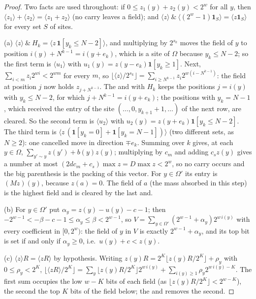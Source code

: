 \documentclass[11pt,a4paper]{article}
\theoremstyle{definition}
\theoremstyle{remark}
\begin{document}
\begin{proof}
Two facts are used throughout: if $0\le z_1(y)+z_2(y)<2^w$ for all $y$, then $\langle z_1\rangle+\langle z_2\rangle=\langle z_1+z_2\rangle$ (no carry leaves a field); and $\langle z\rangle\ \&\ \langle(2^w-1)\mathbf 1_S\rangle=\langle z\mathbf 1_S\rangle$ for every set $S$ of sites.

(a) $\langle z\rangle\ \&\ H_k=\langle z\,\mathbf 1[y_k\le N-2]\rangle$, and multiplying by $2^{s_k}$ moves the field of $y$ to position $i(y)+N^{k-1}=i(y+e_k)$, which is a site of $\Omega$ because $y_k\le N-2$; so the first term is $\langle u_1\rangle$ with $u_1(y)=z(y-e_k)\mathbf 1[y_k\ge1]$. Next, $\sum_{i<m}z_i2^{wi}<2^{wm}$ for every $m$, so $\lfloor\langle z\rangle/2^{s_k}\rfloor=\sum_{i\ge N^{k-1}}z_i2^{w(i-N^{k-1})}$: the field at position $j$ now holds $z_{j+N^{k-1}}$. The and with $H_k$ keeps the positions $j=i(y)$ with $y_k\le N-2$, for which $j+N^{k-1}=i(y+e_k)$; the positions with $y_k=N-1$, which received the entry of the site $(\dots,0,y_{k+1}+1,\dots)$ of the next row, are cleared. So the second term is $\langle u_2\rangle$ with $u_2(y)=z(y+e_k)\mathbf 1[y_k\le N-2]$. The third term is $\langle z\,(\mathbf 1[y_k=0]+\mathbf 1[y_k=N-1])\rangle$ (two different sets, as $N\ge2$): one cancelled move in direction $\mp e_k$. Summing over $k$ gives, at each $y\in\Omega$, $\sum_{y'\sim y}z(y')+b(y)z(y)$; multiplying by $c_m$ and adding $c_sz(y)$ gives a number at most $(2dc_m+c_s)\max z=D\max z<2^w$, so no carry occurs and the big parenthesis is the packing of this vector. For $y\in\Omega'$ its entry is $(Mz)(y)$, because $z(a)=0$. The field of $a$ (the mass absorbed in this step) is the highest field and is cleared by the last and.

(b) For $y\in\Omega'$ put $\alpha_y=z(y)-u(y)-c-1$; then $-2^{w-1}<-\beta-c-1\le\alpha_y\le\beta<2^{w-1}$, so $V=\sum_{y\in\Omega'}(2^{w-1}+\alpha_y)2^{w\,i(y)}$ with every coefficient in $[0,2^w)$: the field of $y$ in $V$ is exactly $2^{w-1}+\alpha_y$, and its top bit is set if and only if $\alpha_y\ge0$, i.e.\ $u(y)+c<z(y)$.

(c) $\langle z\rangle R=\langle zR\rangle$ by hypothesis. Writing $z(y)R=2^K\lfloor z(y)R/2^K\rfloor+\rho_y$ with $0\le\rho_y<2^K$,
$\lfloor\langle zR\rangle/2^K\rfloor=\sum_y\lfloor z(y)R/2^K\rfloor2^{w\,i(y)}+\sum_{i(y)\ge1}\rho_y2^{w\,i(y)-K}$. The first sum occupies the low $w-K$ bits of each field (as $\lfloor z(y)R/2^K\rfloor<2^{w-K}$), the second the top $K$ bits of the field below; the and removes the second.
\end{proof}
\end{document}
